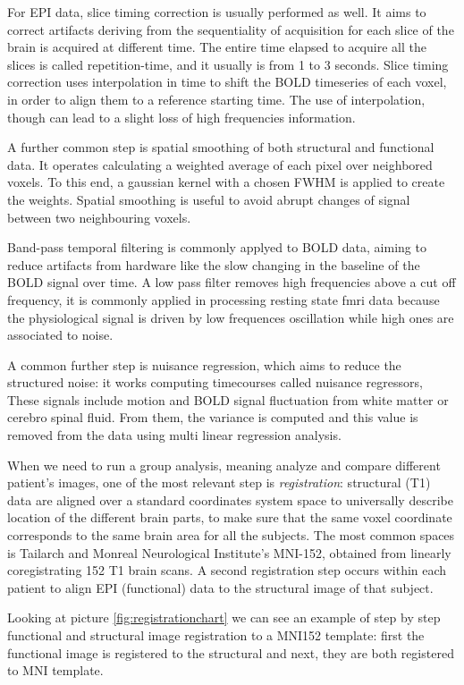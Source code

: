 \documentclass[a4paper,11pt]{article}
\begin{document}
For EPI data, slice timing correction is usually performed as well. It aims to correct artifacts deriving from the sequentiality of acquisition for each slice of the brain is acquired at different time.
The entire time elapsed to acquire all the slices is called repetition-time, and it usually is from 1 to 3 seconds.
Slice timing correction uses interpolation in time to shift the BOLD timeseries of each voxel, in order to align them to a reference starting time.
The use of interpolation, though can lead to a slight loss of high frequencies information.

A further common step is spatial smoothing of both structural and functional data. It operates calculating a weighted average of each pixel over neighbored voxels. To this end, a gaussian kernel with a chosen FWHM is applied to create the weights.
Spatial smoothing is useful to avoid abrupt changes of signal between two neighbouring voxels.

Band-pass temporal filtering is commonly applyed to BOLD data, aiming to reduce artifacts from hardware like the slow changing in the baseline of the BOLD signal over time. A low pass filter removes high frequencies above a cut off frequency, it is commonly applied in processing resting state fmri data because the physiological signal is driven by low frequences oscillation while high ones are associated to noise.

A common further step is nuisance regression, which aims to reduce the structured noise: it works computing timecourses called nuisance regressors,
These signals include motion and BOLD signal fluctuation from white matter or cerebro spinal fluid.
From them, the variance is computed and this value is removed from the data using multi linear regression analysis.

When we need to run a group analysis, meaning analyze and compare different patient's images, one of the most relevant step is \emph{registration}: structural (T1) data are aligned over a standard coordinates system space to universally describe location of the different brain parts, to make sure that the same voxel coordinate corresponds to the same brain area for all the subjects.
The most common spaces is Tailarch and Monreal Neurological Institute's MNI-152, obtained from linearly coregistrating 152 T1 brain scans.
A second registration step occurs within each patient to align EPI (functional) data to the structural image of that subject.

Looking at picture \ref{fig:registrationchart} we can see an example of step by step functional and structural image registration to a MNI152 template: first the functional image is registered to the structural and next, they are both registered to MNI template.
\end{document}
